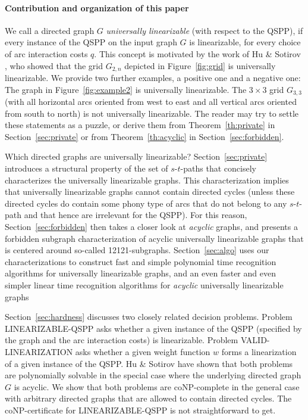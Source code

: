 \documentclass[runningheads]{llncs}
\begin{document}
\paragraph*{Contribution and organization of this paper}
We call a directed graph $G$ \emph{universally linearizable} (with respect to the QSPP), 
if every instance of the QSPP on the input graph $G$ is linearizable, for every choice 
of arc interaction costs $q$.
This concept is motivated by the work of Hu \& Sotirov \cite{HuSo2018a}, who showed that 
the grid $G_{2,n}$ depicted in Figure~\ref{fig:grid} is universally linearizable.
We provide two further examples, a positive one and a negative one: 
The graph in Figure~\ref{fig:example2} is universally linearizable.
The $3\times3$ grid $G_{3,3}$ (with all horizontal arcs oriented from west to east and 
all vertical arcs oriented from south to north) is not universally linearizable.
The reader may try to settle these statements as a puzzle, or derive them from Theorem~\ref{th:private}
in Section~\ref{sec:private} or from Theorem~\ref{th:acyclic} in Section~\ref{sec:forbidden}.

Which directed graphs are universally linearizable?
Section~\ref{sec:private} introduces a structural property of the set of $s$-$t$-paths that
concisely characterizes the universally linearizable graphs.
This characterization implies that universally linearizable graphs cannot contain directed cycles
(unless these directed cycles do contain some phony type of arcs that do not belong to 
any $s$-$t$-path and that hence are irrelevant for the QSPP).
For this reason, Section~\ref{sec:forbidden} then takes a closer look at \emph{acyclic} graphs, 
and presents a forbidden subgraph characterization of acyclic universally linearizable graphs 
that is centered around so-called 12121-subgraphs.
Section~\ref{sec:algo} uses our characterizations to construct fast and simple polynomial time 
recognition algorithms for universally linearizable graphs, and an even faster and even simpler
linear time recognition algorithms for \emph{acyclic} universally linearizable graphs

Section~\ref{sec:hardness} discusses two closely related decision problems.
Problem LINEARI\-ZABLE-QSPP asks whether a given instance of the QSPP (specified by the 
graph and the arc interaction costs) is linearizable.
Problem VALID-LINEARIZATION asks whether a given weight function $w$ forms a linearization
of a given instance of the QSPP. 
Hu \& Sotirov \cite{HuSo2018b} have shown that both problems are polynomially solvable 
in the special case where the underlying directed graph $G$ is acyclic.
We show that both problems are coNP-complete in the general case with arbitrary directed 
graphs that are allowed to contain directed cycles.
The coNP-certificate for LINEARIZABLE-QSPP is not straightforward to get.
\end{document}
